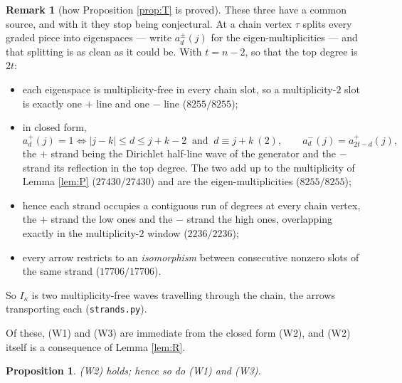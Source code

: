 \documentclass[11pt,reqno]{amsart}
\theoremstyle{plain}
\newtheorem{proposition}[theorem]{Proposition}
\theoremstyle{definition}
\newtheorem{remark}[theorem]{Remark}
\newcommand{\ka}{\kappa}
\begin{document}
\begin{remark}[how Proposition \ref{prop:T} is proved]
These three have a common source, and with it they stop being conjectural.  At a
chain vertex $\tau$ splits every graded piece into eigenspaces --- write
$a^{\pm}_d(j)$ for the eigen-multiplicities --- and that splitting is as clean
as it could be.  With $t=n-2$, so that the top degree is $2t$:
\begin{itemize}\itemsep0pt
\item[(W1)] each eigenspace is multiplicity-free in every chain slot, so a
multiplicity-$2$ slot is exactly one $+$ line and one $-$ line ($8255/8255$);
\item[(W2)] in closed form,
\[
   a^{+}_d(j)=1 \iff |j-k|\le d\le j+k-2 \ \text{ and }\ d\equiv j+k\ (2),
   \qquad a^{-}_d(j)=a^{+}_{2t-d}(j),
\]
the $+$ strand being the Dirichlet half-line wave of the generator and the $-$
strand its reflection in the top degree.  The two add up to the multiplicity of
Lemma \ref{lem:P} ($27430/27430$) and are the eigen-multiplicities ($8255/8255$);
\item[(W3)] hence each strand occupies a contiguous run of degrees at every
chain vertex, the $+$ strand the low ones and the $-$ strand the high ones,
overlapping exactly in the multiplicity-$2$ window ($2236/2236$);
\item[(W4)] every arrow restricts to an \emph{isomorphism} between consecutive
nonzero slots of the same strand ($17706/17706$).
\end{itemize}
So $I_\ka$ is two multiplicity-free waves travelling through the chain, the
arrows transporting each (\texttt{strands.py}).

Of these, (W1) and (W3) are immediate from the closed form (W2), and (W2) itself
is a consequence of Lemma \ref{lem:R}.

\begin{proposition}\label{prop:W2}
(W2) holds; hence so do (W1) and (W3).
\end{proposition}


\end{remark}
\end{document}
